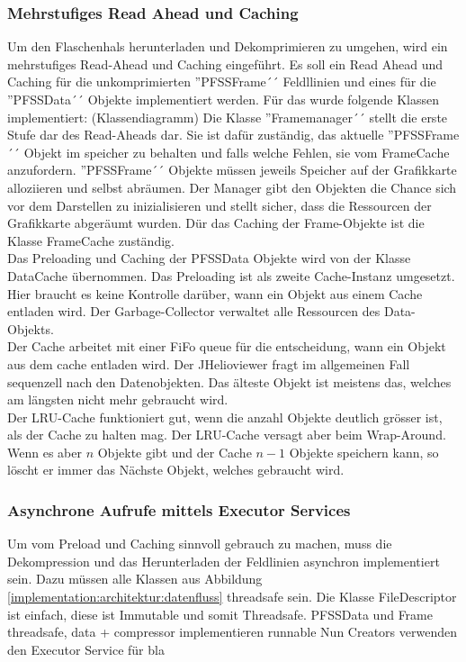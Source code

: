 \subsubsection{Mehrstufiges Read Ahead und Caching}
Um den Flaschenhals herunterladen und Dekomprimieren zu umgehen, wird ein mehrstufiges Read-Ahead und Caching eingeführt. Es soll ein Read Ahead und Caching für die unkomprimierten ''PFSSFrame´´ Feldllinien und eines für die ''PFSSData´´ Objekte implementiert werden. Für das wurde folgende Klassen implementiert:
(Klassendiagramm)
Die Klasse ''Framemanager´´ stellt die erste Stufe dar des Read-Aheads dar. Sie ist dafür zuständig, das aktuelle ''PFSSFrame´´ Objekt im speicher zu behalten und falls welche Fehlen, sie vom FrameCache anzufordern. ''PFSSFrame´´ Objekte müssen jeweils Speicher auf der Grafikkarte alloziieren und selbst abräumen. Der Manager gibt den Objekten die Chance sich vor dem Darstellen zu inizialisieren und stellt sicher, dass die Ressourcen der Grafikkarte abgeräumt wurden. Dür das Caching der Frame-Objekte ist die Klasse FrameCache zuständig.\\
Das Preloading und Caching der PFSSData Objekte wird von der Klasse DataCache übernommen. Das Preloading ist als zweite Cache-Instanz umgesetzt. Hier braucht es keine Kontrolle darüber, wann ein Objekt aus einem Cache entladen wird. Der Garbage-Collector verwaltet alle Ressourcen des Data-Objekts.\\
[\baselineskip] 
Der Cache arbeitet mit einer FiFo queue für die entscheidung, wann ein Objekt aus dem cache entladen wird. Der JHelioviewer fragt im allgemeinen Fall sequenzell nach den Datenobjekten. Das älteste Objekt ist meistens das, welches am längsten nicht mehr gebraucht wird.\\
Der LRU-Cache funktioniert gut, wenn die anzahl Objekte deutlich grösser ist, als der Cache zu halten mag. Der LRU-Cache versagt aber beim Wrap-Around. Wenn es aber $n$ Objekte gibt und der Cache $n-1$ Objekte speichern kann, so löscht er immer das Nächste Objekt, welches gebraucht wird. 

\subsubsection{Asynchrone Aufrufe mittels Executor Services}
Um vom Preload und Caching sinnvoll gebrauch zu machen, muss die Dekompression und das Herunterladen der Feldlinien asynchron implementiert sein. Dazu müssen alle Klassen aus Abbildung \ref{implementation:architektur:datenfluss} threadsafe sein.
Die Klasse FileDescriptor ist einfach, diese ist Immutable und somit Threadsafe.
PFSSData und Frame threadsafe, data + compressor implementieren runnable
Nun Creators verwenden den Executor Service für bla


